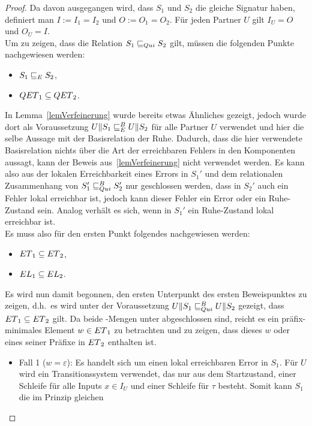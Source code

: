 \begin{proof}
  Da davon ausgegangen wird, dass $S_1$ und $S_2$ die gleiche Signatur haben,
  definiert man $I:=I_1=I_2$ und $O:=O_1=O_2$. Für jeden Partner $U$ gilt
  $I_U=O$ und $O_U=I$.\\
  Um zu zeigen, dass die Relation $S_1\sqsubseteq _{Qui} S_2$ gilt, müssen die
  folgenden Punkte nachgewiesen werden:
  \begin{itemize}
    \item $S_1\sqsubseteq _E S_2$,
    \item $QET{}_1\subseteq QET{}_2$.
  \end{itemize}
  In Lemma~\ref{lemVerfeinerung} wurde bereits etwas Ähnliches gezeigt, jedoch
  wurde dort als Voraussetzung $U\|S_1\sqsubseteq _E^B U\|S_2$ für alle Partner $U$
  verwendet und hier die selbe Aussage mit der Basisrelation der Ruhe. Dadurch,
  dass die hier verwendete Basisrelation nichts über die Art der erreichbaren
  Fehlers in den Komponenten aussagt, kann der Beweis aus~\ref{lemVerfeinerung}
  nicht verwendet werden. Es kann also aus der lokalen Erreichbarkeit eines
  Errors in $S_1'$ und dem relationalen Zusammenhang von $S_1'\sqsubseteq _{Qui}^B S_2'$ nur
  geschlossen werden, dass in $S_2'$ auch ein Fehler lokal erreichbar ist,
  jedoch kann dieser Fehler ein Error oder ein Ruhe-Zustand sein. Analog
  verhält es sich, wenn in $S_1'$ ein Ruhe-Zustand lokal erreichbar ist.\\
  Es muss also für den ersten Punkt folgendes nachgewiesen werden:
  \begin{itemize}
    \item $ET{}_1\subseteq ET{}_2$,
    \item $EL{}_1\subseteq EL{}_2$.
  \end{itemize}
  Es wird nun damit begonnen, den ersten Unterpunkt des ersten Beweispunktes zu
  zeigen, d.h.\ es wird unter der Voraussetzung $U\|S_1\sqsubseteq _{Qui}^B U\|S_2$ gezeigt,
  dass $ET{}_1\subseteq ET{}_2$ gilt. Da beide \ET{}-Mengen
  unter \cont{} abgeschlossen sind, reicht es ein präfix-minimales Element
  $w\in ET{}_1$ zu betrachten und zu zeigen, dass dieses $w$ oder eines seiner
  Präfixe in $ET{}_2$ enthalten ist.
  \begin{itemize}
    \item Fall 1 ($w=\varepsilon$): Es handelt sich um einen lokal erreichbaren
      Error in $S_1$. Für $U$ wird ein Transitionssystem verwendet, das nur aus
      dem Startzustand, einer Schleife für alle Inputs $x\in I_U$ und einer
      Schleife für $\tau$ besteht. Somit kann $S_1$ die im Prinzip gleichen

\end{itemize}
\end{proof}
